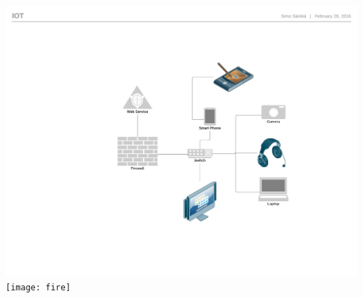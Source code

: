 \documentclass[xcolor=svgnames,english,handout]{beamer}
\begin{document}
\begin{frame}
\begin{columns}
\begin{column}{0.3\textwidth}
  \includegraphics[width=0.8\columnwidth]{IoT} \\
  \texttt{[image: fire]}
  \end{column}
  \end{columns}
\end{frame}
\end{document}

